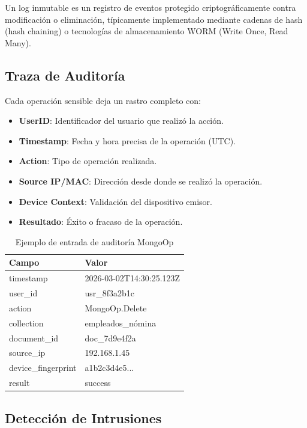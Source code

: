 \begin{definicion}
Un log inmutable es un registro de eventos protegido criptográficamente contra modificación o eliminación, típicamente implementado mediante cadenas de hash (hash chaining) o tecnologías de almacenamiento WORM (Write Once, Read Many).
\end{definicion}

\subsection{Traza de Auditoría}

Cada operación sensible deja un rastro completo con:

\begin{itemize}
\item \textbf{UserID}: Identificador del usuario que realizó la acción.
\item \textbf{Timestamp}: Fecha y hora precisa de la operación (UTC).
\item \textbf{Action}: Tipo de operación realizada.
\item \textbf{Source IP/MAC}: Dirección desde donde se realizó la operación.
\item \textbf{Device Context}: Validación del dispositivo emisor.
\item \textbf{Resultado}: Éxito o fracaso de la operación.
\end{itemize}

\begin{table}[H]
\centering
\caption{Ejemplo de entrada de auditoría MongoOp}
\begin{tabular}{|l|p{10cm}|}
\hline
\textbf{Campo} & \textbf{Valor} \\ \hline
timestamp & 2026-03-02T14:30:25.123Z \\ \hline
user\_id & usr\_8f3a2b1c \\ \hline
action & MongoOp.Delete \\ \hline
collection & empleados\_nómina \\ \hline
document\_id & doc\_7d9e4f2a \\ \hline
source\_ip & 192.168.1.45 \\ \hline
device\_fingerprint & a1b2c3d4e5... \\ \hline
result & success \\ \hline
\end{tabular}
\end{table}

\subsection{Detección de Intrusiones}

